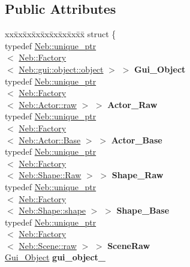 \subsection*{\-Public \-Attributes}
\begin{DoxyCompactItemize}
\item 
\hypertarget{classNeb_1_1master_a69e3a725463ca5d38c7e2b81232101e5}{\begin{tabbing}
xx\=xx\=xx\=xx\=xx\=xx\=xx\=xx\=xx\=\kill
struct \{\\
\>typedef \hyperlink{classNeb_1_1unique__ptr}{Neb::unique\_ptr}\\
$<$ \hyperlink{classNeb_1_1Factory}{Neb::Factory}\\
$<$ \hyperlink{classNeb_1_1gui_1_1object_1_1object}{Neb::gui::object::object} $>$ $>$ {\bfseries Gui\_Object}\\
\>typedef \hyperlink{classNeb_1_1unique__ptr}{Neb::unique\_ptr}\\
$<$ \hyperlink{classNeb_1_1Factory}{Neb::Factory}\\
$<$ \hyperlink{classNeb_1_1Actor_1_1raw}{Neb::Actor::raw} $>$ $>$ {\bfseries Actor\_Raw}\\
\>typedef \hyperlink{classNeb_1_1unique__ptr}{Neb::unique\_ptr}\\
$<$ \hyperlink{classNeb_1_1Factory}{Neb::Factory}\\
$<$ \hyperlink{classNeb_1_1Actor_1_1Base}{Neb::Actor::Base} $>$ $>$ {\bfseries Actor\_Base}\\
\>typedef \hyperlink{classNeb_1_1unique__ptr}{Neb::unique\_ptr}\\
$<$ \hyperlink{classNeb_1_1Factory}{Neb::Factory}\\
$<$ \hyperlink{classNeb_1_1Shape_1_1Raw}{Neb::Shape::Raw} $>$ $>$ {\bfseries Shape\_Raw}\\
\>typedef \hyperlink{classNeb_1_1unique__ptr}{Neb::unique\_ptr}\\
$<$ \hyperlink{classNeb_1_1Factory}{Neb::Factory}\\
$<$ \hyperlink{classNeb_1_1Shape_1_1shape}{Neb::Shape::shape} $>$ $>$ {\bfseries Shape\_Base}\\
\>typedef \hyperlink{classNeb_1_1unique__ptr}{Neb::unique\_ptr}\\
$<$ \hyperlink{classNeb_1_1Factory}{Neb::Factory}\\
$<$ \hyperlink{classNeb_1_1Scene_1_1raw}{Neb::Scene::raw} $>$ $>$ {\bfseries SceneRaw}\\
\>\hyperlink{classNeb_1_1unique__ptr}{Gui\_Object} {\bfseries gui\_object\_}\\

\end{tabbing}}
\end{DoxyCompactItemize}
